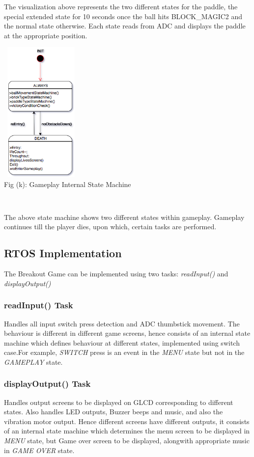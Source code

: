 \documentclass{article}
\begin{document}
\qquad The visualization above represents the two different states for the paddle, the special extended state for 10 seconds once the ball hits BLOCK\_MAGIC2 and the normal state otherwise. Each state reads from ADC and displays the paddle at the appropriate position.
\begin{center}
\includegraphics[width=4cm, height=7cm]{Images/gameplayStateMachine}\\
\caption{Fig (k): Gameplay Internal State Machine} \\
\end{center}
\qquad The above state machine shows two different states within gameplay. Gameplay continues till the player dies, upon which, certain tasks are performed.

 \subsection{RTOS Implementation}
 \qquad The Breakout Game can be implemented using two tasks: \textit{readInput()} and \textit{displayOutput()}
 \subsubsection{readInput() Task}
 \qquad Handles all input switch press detection and ADC thumbstick movement. The behaviour is different in different game screens, hence consists of an internal state machine which defines behaviour at different states, implemented using switch case.For example, \textit{SWITCH} press is an event in the \textit{MENU} state but not in the \textit{GAMEPLAY} state.
 \subsubsection{displayOutput() Task}
 \qquad Handles output screens to be displayed on GLCD corresponding to different states. Also handles LED outputs, Buzzer beeps and music, and also the vibration motor output. Hence different screens have different outputs, it consists of an internal state machine which determines the menu screen to be displayed in \textit{MENU} state, but Game over screen to be displayed, alongwith appropriate music in \textit{GAME OVER} state.
\end{document}
